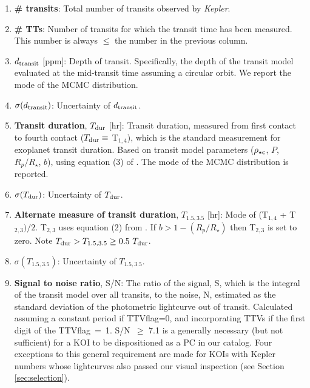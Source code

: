 \documentclass{aastex62}
\newcommand{\ikt}{{\it Kepler}}
\newcommand{\rhoc}{\ensuremath{\rho_{\star {\rm c}}}}
\begin{document}
\begin{enumerate}
   \item \textbf{\# transits}: Total number of transits observed by \ikt.
   \item \textbf{\# TTs}: Number of transits for which the transit time has been measured.  This number is always $\leq$ the number in the previous column.
    \item \textbf{$d_{\rm transit}$} [ppm]: Depth of transit. Specifically, the depth of the transit model evaluated at the mid-transit time assuming a circular orbit. We report the mode of the MCMC distribution.  
   \item \textbf{$\sigma(d_{\rm transit})$}: Uncertainty of $d_{\rm transit}$.
   \item \textbf{Transit duration}, $T_{\rm dur}$ [hr]:  Transit duration, measured from first contact to fourth contact ($T_{\rm dur}\equiv$ T$_{1,4}$), which is the standard measurement for exoplanet transit duration. Based on transit model parameters ($\rhoc$, $P$, $R_p/R_\star$, $b$), using equation (3) of \citet{Seager:2003}.  The mode of the MCMC distribution is reported.  
   \item \textbf{$\sigma(T_{\rm dur})$}: Uncertainty of $T_{\rm dur}$.
   \item \textbf{Alternate measure of transit duration}, $T_{1.5,3.5}$ [hr]: Mode of (T$_{1,4}$ + T$_{2,3})/2$. T$_{2,3}$ uses equation (2) from \citet{Seager:2003}.  If $b> 1-(R_p/R_\star)$ then T$_{2,3}$ is set to zero. Note $T_{\rm dur} > T_{1.5,3.5} \ge 0.5~T_{\rm dur}$.%
   \item \textbf{$\sigma(T_{1.5,3.5})$}: Uncertainty of $T_{1.5,3.5}$.
    \item \textbf{Signal to noise ratio}, S/N: The ratio of the signal, S, which is the integral of the transit model over all transits, to the noise, N, estimated as the standard deviation of the photometric lightcurve out of transit.  Calculated assuming a constant period if  TTVflag=0, and incorporating TTVs if the first digit of the TTVflag~=~1. S/N~$\geq$ 7.1 is a generally necessary (but not sufficient) for a KOI to be dispositioned as a PC in our catalog. {Four exceptions to this general requirement are made for KOIs with Kepler numbers whose lightcurves also passed our visual inspection (see Section \ref{sec:selection}).}

\end{enumerate}
\end{document}
